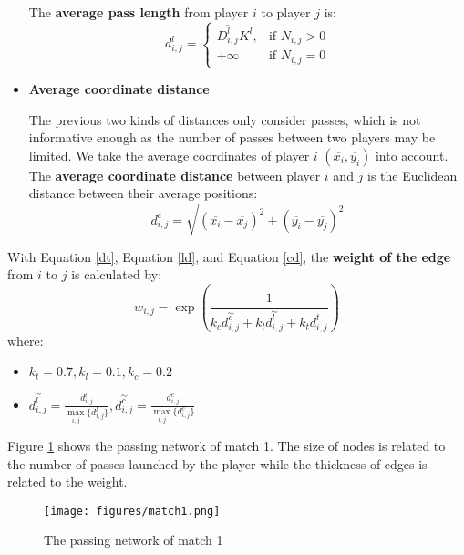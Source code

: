 \documentclass{mcmthesis}
\begin{document}
\begin{itemize}
\qquad The \textbf{average pass length} from player $i$ to player $j$ is:
\begin{equation}\label{ld}
  d_{i,j}^{l}=
  \begin{cases}
    \overline{D_{i,j}^l}K^l, & \mbox{if } N_{i,j}>0 \\
    +\infty & \mbox{if }N_{i,j}=0
  \end{cases}
\end{equation}

  \item \textbf{Average coordinate distance}

  \qquad The previous two kinds of distances only consider passes, which is not informative enough as the number of passes between two players may be limited. We take the average coordinates of player $i$ $(\overline{x_i},\overline{y_i})$  into account. The \textbf{average coordinate distance} between player $i$ and $j$ is the Euclidean distance between their average positions:
  \begin{equation}\label{cd}
    d_{i,j}^c = \sqrt{(\overline{x_i} - \overline{x_j})^2 + (\overline{y_i} - \overline{y_j})^2}
  \end{equation}
\end{itemize}

With Equation \eqref{dt}, Equation \eqref{ld}, and Equation \eqref{cd}, the \textbf{weight of the edge} from $i$ to $j$ is calculated by:
\begin{equation}\label{weight}
  w_{i,j} = \exp\left(\frac{1}{k_c \stackrel{\sim}{d_{i,j}^c} + k_l \stackrel{\sim}{d_{i,j}^l} + k_td_{i,j}^t}\right)
\end{equation}
where:
\begin{itemize}
  \item $k_t = 0.7, k_l = 0.1, k_c = 0.2$
  \item $\stackrel{\sim}{d_{i,j}^l} = \frac{d_{i,j}^l}{\max \limits_{i,j}\{d_{i,j}^l\}},\stackrel{\sim}{d_{i,j}^c} = \frac{d_{i,j}^c}{\max \limits_{i,j}\{d_{i,j}^c\}}$
\end{itemize}

Figure \ref{match1} shows the passing network of match 1. The size of nodes is related to the number of passes launched by the player while the thickness of edges is related to the weight.
\begin{figure}[htbp]
  \centering
  \texttt{[image: figures/match1.png]}
  \caption{The passing network of match 1}\label{match1}
\end{figure}
\end{document}

